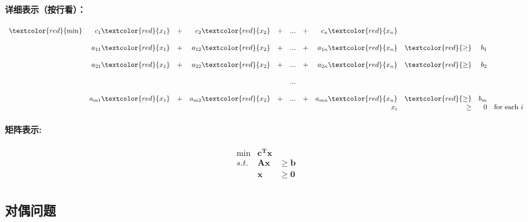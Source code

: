			\paragraph{详细表示（按行看）：}
			\[
			\begin{array}{rrrrrrrrrrrrl}
				\textcolor{red}{ \min} & c_1\textcolor{red}{ x_1}    &+&  c_2\textcolor{red}{ x_2}   &+&  ...&+& c_n\textcolor{red}{ x_n}    &      &    & \\
       			&   & & & & & & & & & \\
      			& a_{11}\textcolor{red}{ x_1} &+& a_{12}\textcolor{red}{ x_2} &+& ... &+& a_{1n}\textcolor{red}{ x_n }& \textcolor{red}{\geq} & b_1 &  \\
           		&   & & & & & & & & & \\
      			& a_{21}\textcolor{red}{ x_1} &+& a_{22}\textcolor{red}{ x_2} &+& ... &+& a_{2n}\textcolor{red}{ x_n} & \textcolor{red}{\geq} & b_2 &  \\
             	&   & & & & & & & & & \\
      			&           & &           & & ... & &           &      &     &  \\
             	&   & & & & & & & & & \\
     			& a_{m1}\textcolor{red}{ x_1} &+& a_{m2}\textcolor{red}{ x_2} &+& ... &+& a_{mn}\textcolor{red}{ x_n} & \textcolor{red}{\geq} & b_m &  \\
      			&           & &           & &     & &       x_i & \geq & 0   & \text{for each }  i \\
     		\end{array} \nonumber
			\]
			\paragraph{矩阵表示:}
			\[
			\begin{array}{rrrrrrrrl}
 				\min & \mathbf{ c^T x} &    \\
 				s.t. & \mathbf{A x} &  \mathbf{\geq b}   \\
      			&\mathbf{x} &  \mathbf{\geq 0 }\\
				\end{array} \nonumber
			\]
		\subsection{对偶问题}
